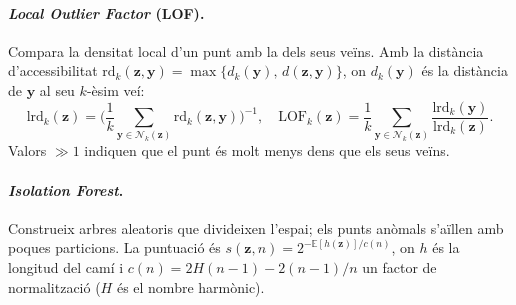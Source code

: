 \documentclass[11pt,a4paper]{article}
\begin{document}
\paragraph{\textit{Local Outlier Factor} (LOF).} \cite{breunig2000} Compara la
densitat local d'un punt amb la dels seus veïns. Amb la distància d'accessibilitat
$\mathrm{rd}_k(\mathbf{z},\mathbf{y})=\max\{d_k(\mathbf{y}),\,d(\mathbf{z},\mathbf{y})\}$,
on $d_k(\mathbf{y})$ és la distància de $\mathbf{y}$ al seu $k$-èsim veí:
\begin{equation}
  \mathrm{lrd}_k(\mathbf{z})=\Bigg(\frac{1}{k}\sum_{\mathbf{y}\in\mathcal{N}_k(\mathbf{z})}\mathrm{rd}_k(\mathbf{z},\mathbf{y})\Bigg)^{-1},\quad
  \mathrm{LOF}_k(\mathbf{z})=\frac1k\sum_{\mathbf{y}\in\mathcal{N}_k(\mathbf{z})}\frac{\mathrm{lrd}_k(\mathbf{y})}{\mathrm{lrd}_k(\mathbf{z})}.
\end{equation}
Valors $\gg 1$ indiquen que el punt és molt menys dens que els seus veïns.

\paragraph{\textit{Isolation Forest}.} \cite{liu2008} Construeix arbres
aleatoris que divideixen l'espai; els punts anòmals s'aïllen amb poques
particions. La puntuació és
$s(\mathbf{z},n)=2^{-\mathbb{E}[h(\mathbf{z})]/c(n)}$, on $h$ és la longitud del
camí i $c(n)=2H(n-1)-2(n-1)/n$ un factor de normalització ($H$ és el nombre
harmònic).
\end{document}
